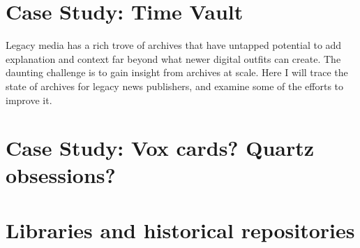 
\section{Case Study: Time Vault}


Legacy media has a rich trove of archives that have untapped potential to add explanation and context far beyond what newer digital outfits can create. The daunting challenge is to gain insight from archives at scale. Here I will trace the state of archives for legacy news publishers, and examine some of the efforts to improve it.




\section{Case Study: Vox cards? Quartz obsessions?}


\section{Libraries and historical repositories}

